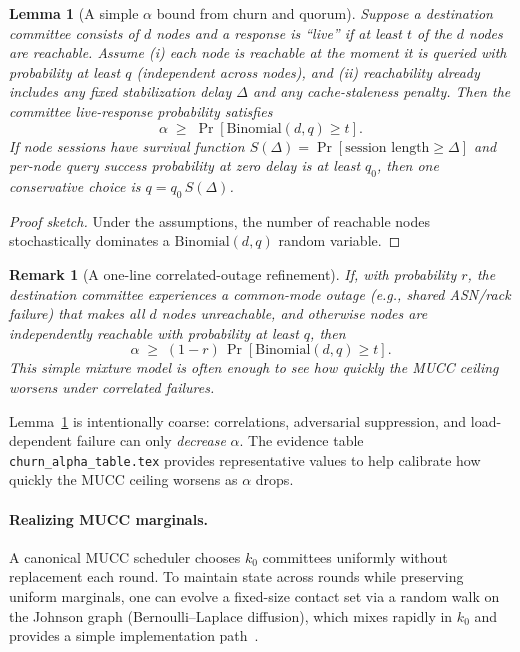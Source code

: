 \documentclass[11pt]{article}
\newtheorem{lemma}{Lemma}
\newtheorem{remark}{Remark}
\begin{document}
\begin{lemma}[A simple $\alpha$ bound from churn and quorum]
\label{lem:alpha-from-churn}
Suppose a destination committee consists of $d$ nodes and a response is ``live'' if at least $t$ of the $d$ nodes are reachable.
Assume (i) each node is reachable at the moment it is queried with probability at least $q$ (independent across nodes), and (ii) reachability already includes any fixed stabilization delay $\Delta$ and any cache-staleness penalty.
Then the committee live-response probability satisfies
\[
\alpha\;\ge\;\Pr[\mathrm{Binomial}(d,q)\ge t].
\]
If node sessions have survival function $S(\Delta)=\Pr[\text{session length}\ge \Delta]$ and per-node query success probability at zero delay is at least $q_0$, then one conservative choice is $q=q_0\,S(\Delta)$.
\end{lemma}

\begin{proof}[Proof sketch]
Under the assumptions, the number of reachable nodes stochastically dominates a $\mathrm{Binomial}(d,q)$ random variable.
\end{proof}

\begin{remark}[A one-line correlated-outage refinement]
If, with probability $r$, the destination committee experiences a common-mode outage (e.g., shared ASN/rack failure) that makes all $d$ nodes unreachable, and otherwise nodes are independently reachable with probability at least $q$, then
\[\alpha\;\ge\;(1-r)\,\Pr[\mathrm{Binomial}(d,q)\ge t].\]
This simple mixture model is often enough to see how quickly the MUCC ceiling worsens under correlated failures.
\end{remark}

Lemma~\ref{lem:alpha-from-churn} is intentionally coarse: correlations, adversarial suppression, and load-dependent failure can only \emph{decrease} $\alpha$.
The evidence table \texttt{churn\_alpha\_table.tex} provides representative values to help calibrate how quickly the MUCC ceiling worsens as $\alpha$ drops.

\paragraph{Realizing MUCC marginals.}
A canonical MUCC scheduler chooses $k_0$ committees uniformly without replacement each round.
To maintain state across rounds while preserving uniform marginals, one can evolve a fixed-size contact set via a random walk on the Johnson graph (Bernoulli--Laplace diffusion), which mixes rapidly in $k_0$ and provides a simple implementation path~\cite{diaconis1987bernoulliLaplace}.
\end{document}
